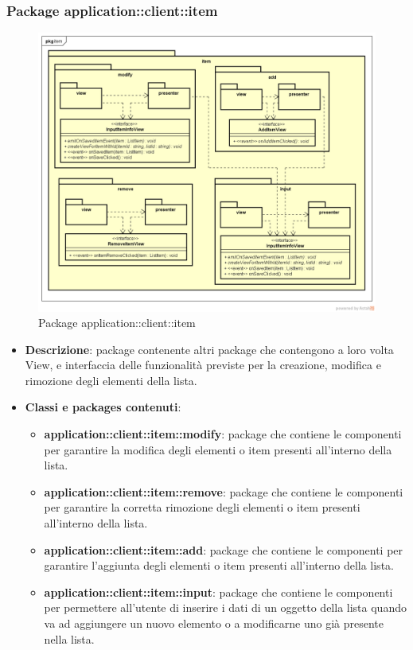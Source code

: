 \subsubsection{Package application::client::item}
\label{Package application::client::item}
\begin{figure}[H]
	\centering
	\includegraphics[scale=0.5]{Sezioni/Packages/App/pck_client_item.png}
	\caption{Package application::client::item}
\end{figure}
\begin{itemize}
	\item \textbf{Descrizione}: package contenente altri package che contengono a loro volta View,  e interfaccia delle funzionalità previste per la creazione, modifica e rimozione degli elementi della lista.
	\item \textbf{Classi e packages contenuti}:
	\begin{itemize}
	\item \textbf{application::client::item::modify}: package che contiene le componenti per garantire la modifica degli elementi o item presenti all'interno della lista.
	\item \textbf{application::client::item::remove}: package che contiene le componenti per garantire la corretta rimozione degli elementi o item presenti all'interno della lista.
	\item \textbf{application::client::item::add}: package che contiene le componenti per garantire l'aggiunta degli elementi o item presenti all'interno della lista.
	\item \textbf{application::client::item::input}: package che contiene le componenti per permettere all'utente di inserire i dati di un oggetto della lista quando va ad aggiungere un nuovo elemento o a modificarne uno già presente nella lista.
\end{itemize}
\end{itemize}

